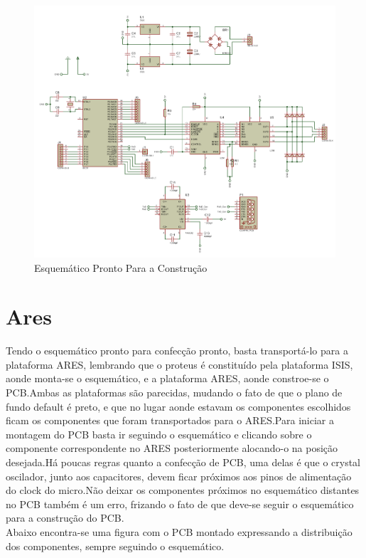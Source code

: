 \documentclass{Fabiano_file}
\begin{document}
{	\newpage
	\clearpage
	\begin{figure}
		\centering
		\includegraphics[width=.9\linewidth]{esquematico_pronto_para_construcao}
		\caption{Esquemático Pronto Para a Construção}
	\end{figure}
	\clearpage
	\newpage

\section{Ares}
Tendo o esquemático pronto para confecção pronto, basta transportá-lo para a plataforma ARES, lembrando que o proteus é constituído pela plataforma ISIS, aonde 
monta-se o esquemático, e a plataforma ARES, aonde constroe-se o PCB.Ambas as plataformas são parecidas, mudando o fato de que o plano de fundo default é preto,
e que no lugar aonde estavam os componentes escolhidos ficam os componentes que foram transportados para o ARES.Para iniciar a montagem do PCB basta ir seguindo
o esquemático e clicando sobre o componente correspondente no ARES posteriormente alocando-o na posição desejada.Há poucas regras quanto a confecção de PCB, uma 
delas é que o crystal oscilador, junto aos capacitores, devem ficar próximos aos pinos de alimentação do clock do micro.Não deixar os componentes próximos no 
esquemático distantes no PCB também é um erro, frizando o fato de que deve-se seguir o esquemático para a construção do PCB.\\
Abaixo encontra-se uma figura com o PCB montado expressando a distribuição dos componentes, sempre seguindo o esquemático.

}
\end{document}

